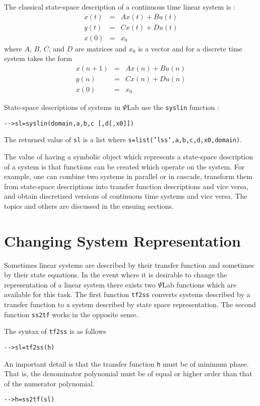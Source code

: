	The classical state-space description of a continuous time linear 
system is :
\begin{eqnarray}
\dot{x}(t)&=&Ax(t)+Bu(t)\nonumber\\
y(t)&=&Cx(t)+Du(t)\nonumber\\
x(0)&=&x_0\nonumber
\end{eqnarray}
where $A$, $B$, $C$, and $D$ are matrices and $x_0$ is a vector
and for a discrete time system takes the form
\begin{eqnarray}
x(n+1)&=&Ax(n)+Bu(n)\nonumber\\
y(n)&=&Cx(n)+Du(n)\nonumber\\
x(0)&=&x_0\nonumber
\end{eqnarray}

	State-space descriptions of systems in $\Psi$Lab 
use the {\tt syslin} function :
\begin{verbatim}
-->sl=syslin(domain,a,b,c [,d[,x0]])
\end{verbatim}
The returned value of {\tt sl} is a list where
{\tt s=list('lss',a,b,c,d,x0,domain)}.

	The value of having a symbolic object which represents
a state-space description of a system is that functions can be created
which operate on the system.  For example, one can combine two systems
in parallel or in cascade, transform them from state-space descriptions
into transfer function descriptions and vice versa, and obtain
discretized versions of continuous time systems and vice versa.
The topics and others are discussed in the ensuing sections.

\section{Changing System Representation}

	Sometimes linear systems are described by their transfer function
and sometimes by their state equations.  In the event where it is
desirable to change the representation of a linear system there exists two
$\Psi$Lab functions which are available for this task.  The first function
{\tt tf2ss} converts systems described by a transfer function
to a system described by state space representation.  The second
function {\tt ss2tf} works in the opposite sense.

	The syntax of {\tt tf2ss} is as follows
\begin{verbatim}
-->sl=tf2ss(h)
\end{verbatim}	
An important detail is that the
transfer function {\tt h} must be of minimum phase.  That is, the
denominator polynomial must be of equal or higher order than that
of the numerator polynomial.
\begin{verbatim}
-->h=ss2tf(sl)
\end{verbatim}	

